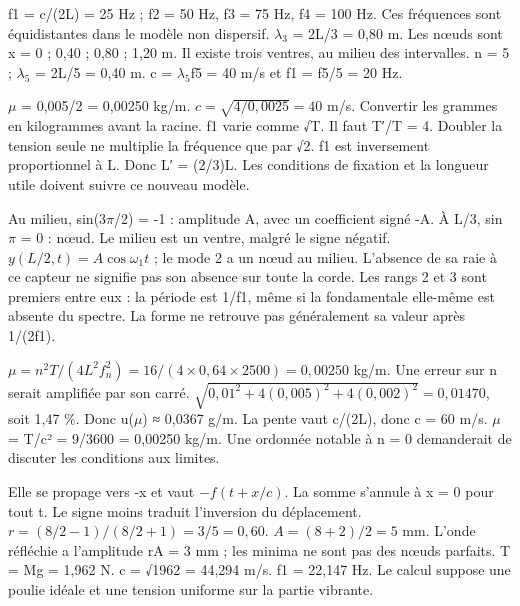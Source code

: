 f1 = c/(2L) = 25 Hz ; f2 = 50 Hz, f3 = 75 Hz, f4 = 100 Hz. Ces fréquences sont équidistantes dans le modèle non dispersif.
\ensuremath{\lambda_3} = 2L/3 = 0,80 m. Les nœuds sont x = 0 ; 0,40 ; 0,80 ; 1,20 m. Il existe trois ventres, au milieu des intervalles.
n = 5 ; \ensuremath{\lambda_5} = 2L/5 = 0,40 m. c = \ensuremath{\lambda_5}f5 = 40 m/s et f1 = f5/5 = 20 Hz.


\ensuremath{\mu} = 0,005/2 = 0,00250 kg/m. $c=\sqrt{4/0{,}0025}=40$ m/s. Convertir les grammes en kilogrammes avant la racine.
f1 varie comme √T. Il faut T′/T = 4. Doubler la tension seule ne multiplie la fréquence que par √2.
f1 est inversement proportionnel à L. Donc L′ = (2/3)L. Les conditions de fixation et la longueur utile doivent suivre ce nouveau modèle.


Au milieu, sin(3\ensuremath{\pi}/2) = -1 : amplitude A, avec un coefficient signé -A. À L/3, sin \ensuremath{\pi} = 0 : nœud. Le milieu est un ventre, malgré le signe négatif.
$y(L/2,t)=A\cos\omega_1t$ ; le mode 2 a un nœud au milieu. L’absence de sa raie à ce capteur ne signifie pas son absence sur toute la corde.
Les rangs 2 et 3 sont premiers entre eux : la période est 1/f1, même si la fondamentale elle-même est absente du spectre. La forme ne retrouve pas généralement sa valeur après 1/(2f1).


$\mu=n^2T/(4L^2f_n^2)=16/(4\times0{,}64\times2500)=0{,}00250$ kg/m. Une erreur sur n serait amplifiée par son carré.
$\sqrt{0{,}01^2+4(0{,}005)^2+4(0{,}002)^2}=0{,}01470$, soit 1,47 \%. Donc u(\ensuremath{\mu}) ≈ 0,0367 g/m.
La pente vaut c/(2L), donc c = 60 m/s. \ensuremath{\mu} = T/c² = 9/3600 = 0,00250 kg/m. Une ordonnée notable à n = 0 demanderait de discuter les conditions aux limites.


Elle se propage vers -x et vaut $-f(t+x/c)$. La somme s’annule à x = 0 pour tout t. Le signe moins traduit l’inversion du déplacement.
$r=(8/2-1)/(8/2+1)=3/5=0{,}60$. $A=(8+2)/2=5$ mm. L’onde réfléchie a l’amplitude rA = 3 mm ; les minima ne sont pas des nœuds parfaits.
T = Mg = 1,962 N. c = √1962 = 44,294 m/s. f1 = 22,147 Hz. Le calcul suppose une poulie idéale et une tension uniforme sur la partie vibrante.


